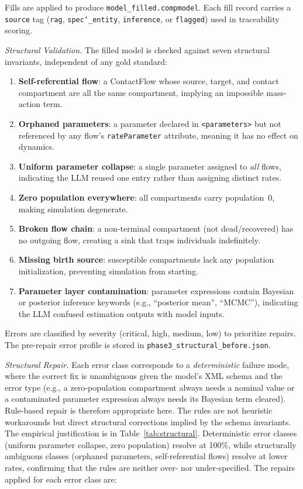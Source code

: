 Fills are applied to produce \texttt{model\_filled.compmodel}. Each fill record carries
a \texttt{source} tag (\texttt{rag}, \texttt{spec\char`\_entity}, \texttt{inference}, or
\texttt{flagged}) used in traceability scoring.

\textit{Structural Validation.}
The filled model is checked against seven structural invariants, independent of any
gold standard:

\begin{enumerate}[leftmargin=*, label=\arabic*.]
  \item \textbf{Self-referential flow}: a ContactFlow whose source, target, and
        contact compartment are all the same compartment, implying an impossible mass-action term.
  \item \textbf{Orphaned parameters}: a parameter declared in
        \texttt{\textless{}parameters\textgreater{}} but
        not referenced by any flow's \texttt{rateParameter} attribute, meaning it has
        no effect on dynamics.
  \item \textbf{Uniform parameter collapse}: a single parameter assigned to
        \emph{all} flows, indicating the LLM reused one entry rather than assigning
        distinct rates.
  \item \textbf{Zero population everywhere}: all compartments carry population~0,
        making simulation degenerate.
  \item \textbf{Broken flow chain}: a non-terminal compartment (not dead/recovered)
        has no outgoing flow, creating a sink that traps individuals indefinitely.
  \item \textbf{Missing birth source}: susceptible compartments lack any population
        initialization, preventing simulation from starting.
  \item \textbf{Parameter layer contamination}: parameter expressions contain
        Bayesian or posterior inference keywords (e.g., ``posterior mean'', ``MCMC''),
        indicating the LLM confused estimation outputs with model inputs.
\end{enumerate}

Errors are classified by severity (critical, high, medium, low) to prioritize repairs.
The pre-repair error profile is stored in \texttt{phase3\_structural\_before.json}.

\textit{Structural Repair.}
Each error class corresponds to a \emph{deterministic} failure mode, where the
correct fix is unambiguous given the model's XML schema and the error type (e.g., a
zero-population compartment always needs a nominal value or a contaminated parameter
expression always needs its Bayesian term cleared). Rule-based repair is therefore
appropriate here. The rules are not heuristic workarounds but direct structural
corrections implied by the schema invariants.
The empirical justification is in Table~\ref{tab:structural}. Deterministic error classes
(uniform parameter collapse, zero population) resolve at 100\%, while structurally
ambiguous classes (orphaned parameters, self-referential flows) resolve at lower rates,
confirming that the rules are neither over- nor under-specified.
The repairs applied for each error class are:

